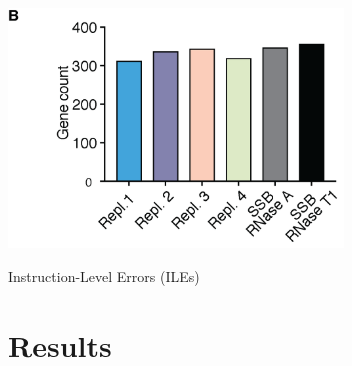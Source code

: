 \documentclass[12pt]{rockefeller}
\begin{document}
\begin{table}[!ht]
\begin{center}
\includegraphics[width=3.5in]{venn_bars.png}%
\caption{Instruction-Level Errors (ILEs)}\label{sC2ILE_Table}
\end{center}
\end{table}

\chapter{Results}

\renewcommand{\bibname}{References}
%
\printbibliography
{} %
\end{document}
